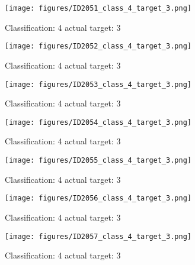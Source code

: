 \begin{figure}[h!]
\begin{center}
\texttt{[image: figures/ID2051\_class\_4\_target\_3.png]}
\end{center}
\caption{ Classification: 4 actual target: 3}
\label{fig:ID2051_class_4_target_3}
\end{figure}
\begin{figure}[h!]
\begin{center}
\texttt{[image: figures/ID2052\_class\_4\_target\_3.png]}
\end{center}
\caption{ Classification: 4 actual target: 3}
\label{fig:ID2052_class_4_target_3}
\end{figure}
\begin{figure}[h!]
\begin{center}
\texttt{[image: figures/ID2053\_class\_4\_target\_3.png]}
\end{center}
\caption{ Classification: 4 actual target: 3}
\label{fig:ID2053_class_4_target_3}
\end{figure}
\begin{figure}[h!]
\begin{center}
\texttt{[image: figures/ID2054\_class\_4\_target\_3.png]}
\end{center}
\caption{ Classification: 4 actual target: 3}
\label{fig:ID2054_class_4_target_3}
\end{figure}
\begin{figure}[h!]
\begin{center}
\texttt{[image: figures/ID2055\_class\_4\_target\_3.png]}
\end{center}
\caption{ Classification: 4 actual target: 3}
\label{fig:ID2055_class_4_target_3}
\end{figure}
\begin{figure}[h!]
\begin{center}
\texttt{[image: figures/ID2056\_class\_4\_target\_3.png]}
\end{center}
\caption{ Classification: 4 actual target: 3}
\label{fig:ID2056_class_4_target_3}
\end{figure}
\begin{figure}[h!]
\begin{center}
\texttt{[image: figures/ID2057\_class\_4\_target\_3.png]}
\end{center}
\caption{ Classification: 4 actual target: 3}
\label{fig:ID2057_class_4_target_3}
\end{figure}
